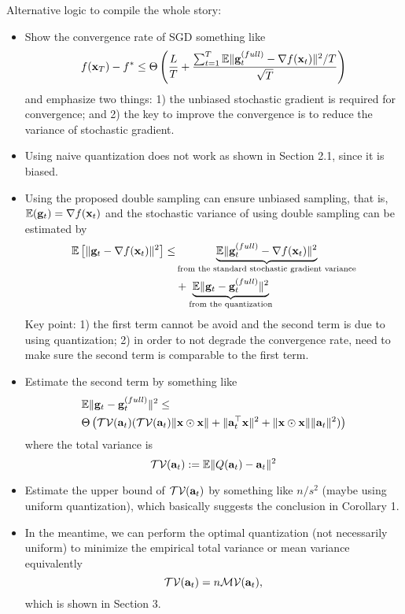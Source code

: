 {\color{red} 
Alternative logic to compile the whole story:

\begin{itemize}
\item Show the convergence rate of SGD something like
\[
f({\bf x}_T) - f^* \leq \Theta\left({L\over T} + {\sum_{t=1}^T \mathbb{E}\|{\bf g}_t^{(full)} - \nabla f({\bf x}_t)\|^2/T \over \sqrt{T}}\right) 
\]
and emphasize two things: 1) the unbiased stochastic gradient is required for convergence; and 2) the key to improve the convergence is to reduce the variance of stochastic gradient.
\item Using naive quantization does not work as shown in Section 2.1, since it is biased.
\item Using the proposed double sampling can ensure unbiased sampling, that is, $\mathbb{E}({\bf g}_t) = \nabla f({\bf x}_t)$ and the stochastic variance of using double sampling can be estimated by
\begin{align*}
\mathbb{E}\left[\|{\bf g}_t - \nabla f({\bf x}_t)\|^2\right] \leq &\underbrace{\mathbb{E} \|{\bf g}_t^{(full)}- \nabla f({\bf x}_t)\|^2}_{\text{from the standard stochastic gradient variance}}
\\
&+ \underbrace{\mathbb{E}\|{\bf g}_t - {\bf g}_t^{(full)}\|^2}_{\text{from the quantization}}
\end{align*}
Key point: 1) the first term cannot be avoid and the second term is due to using quantization; 2) in order to not degrade the convergence rate, need to make sure the second term is comparable to the first term. 
\item Estimate the second term by something like
\begin{align*}
&\mathbb{E}\|{\bf g}_t - {\bf g}_t^{(full)}\|^2 \leq \\
&\Theta\left(\mathcal{TV}({\bf a}_t) (\mathcal{TV}({\bf a}_t)\|{\bf x}\odot {\bf x}\| + \|{\bf a}_t^\top {\bf x}\|^2 + \|{\bf x}\odot {\bf x}\|\|{\bf a}_t\|^2)\right)
\end{align*}
where the total variance is 
\[
\mathcal{TV}({\bf a}_t) := \mathbb{E} \|Q({\bf a}_t) - {\bf a}_t\|^2
\]
\item Estimate the upper bound of $\mathcal{TV}({\bf a}_t)$ by something like $n/s^2$ (maybe using uniform quantization), which basically suggests the conclusion in Corollary 1.
\item In the meantime, we can perform the optimal quantization (not necessarily uniform) to minimize the empirical total variance or mean variance equivalently 
\[
\mathcal{TV}({\bf a}_t) = n\mathcal{MV}({\bf a}_t),
\]
which is shown in Section 3.
\end{itemize}

}


